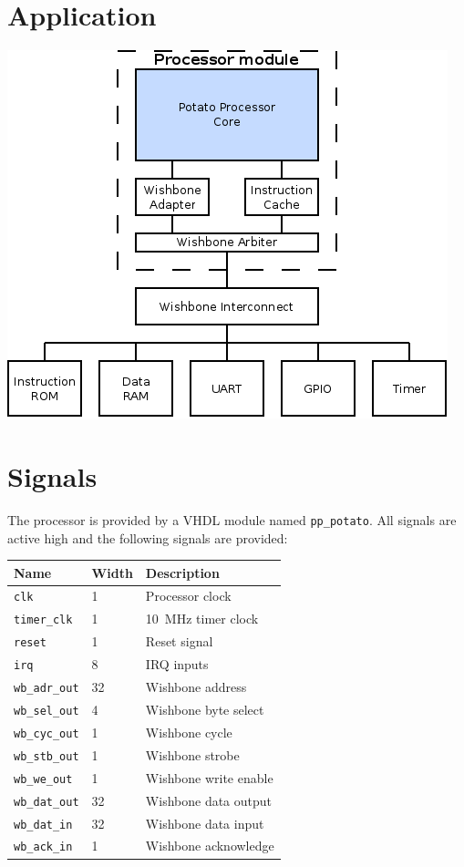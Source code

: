 \documentclass[10pt,a4paper]{article}
\begin{document}
\begin{minipage}[t]{0.48\textwidth}

\section{Application}
\includegraphics[width=\textwidth]{example.png}

\section{Signals}

The processor is provided by a VHDL module named \texttt{pp\_potato}. All signals
are active high and the following signals are provided:\\

\begin{tabularx}{\textwidth}{|l|l|X|}
\hline
\textbf{Name} & \textbf{Width} & \textbf{Description} \\
\hline
\texttt{clk} & 1 & Processor clock \\
\texttt{timer\_clk} & 1 & 10~MHz timer clock \\
\texttt{reset} & 1 & Reset signal \\
\hline
\texttt{irq} & 8 & IRQ inputs \\
\hline
\texttt{wb\_adr\_out} & 32 & Wishbone address \\
\texttt{wb\_sel\_out} & 4 & Wishbone byte select \\
\texttt{wb\_cyc\_out} & 1 & Wishbone cycle \\
\texttt{wb\_stb\_out} & 1 & Wishbone strobe \\
\texttt{wb\_we\_out} & 1 & Wishbone write enable \\
\texttt{wb\_dat\_out} & 32 & Wishbone data output \\
\texttt{wb\_dat\_in} & 32 & Wishbone data input \\
\texttt{wb\_ack\_in} & 1 & Wishbone acknowledge \\
\hline
\end{tabularx}\\


\end{minipage}
\end{document}
